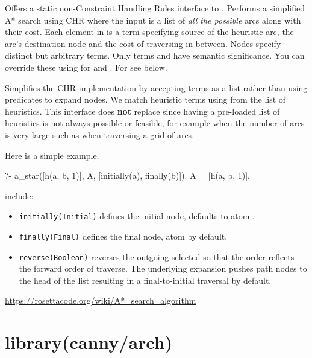 \begin{description}
Offers a static non-Constraint Handling Rules interface to .
Performs a simplified A* search using CHR where the input is a list
of \textit{all the possible} arcs along with their cost. Each element in
 is a  term specifying source of the heuristic arc,
the arc's destination node and the cost of traversing in-between.
Nodes specify distinct but arbitrary terms. Only terms  and
 have semantic significance. You can override these using
 for  and . For  see below.

Simplifies the CHR implementation by accepting  terms as a list
rather than using predicates to expand nodes. We match heuristic
terms using  from the list of heuristics. This interface does
\textbf{not} replace  since having a pre-loaded list of
heuristics is not always possible or feasible, for example when the
number of arcs is very large such as when traversing a grid of arcs.

Here is a simple example.

\begin{code}
?- a_star([h(a, b, 1)], A, [initially(a), finally(b)]).
A = [h(a, b, 1)].
\end{code}

 include:

\begin{itemize}
    \item \verb$initially(Initial)$ defines the initial node, defaults to
atom .
    \item \verb$finally(Final)$ defines the final node, atom  by default.
    \item \verb$reverse(Boolean)$ reverses the outgoing selected  so that
the order reflects the forward order of traverse. The underlying
expansion pushes path nodes to the head of the list resulting in a
final-to-initial traversal by default.
\end{itemize}

\begin{tags}
\url{https://rosettacode.org/wiki/A*_search_algorithm}
\end{tags}
\end{description}

\chapter{library(canny/arch)}\label{sec:arch}

